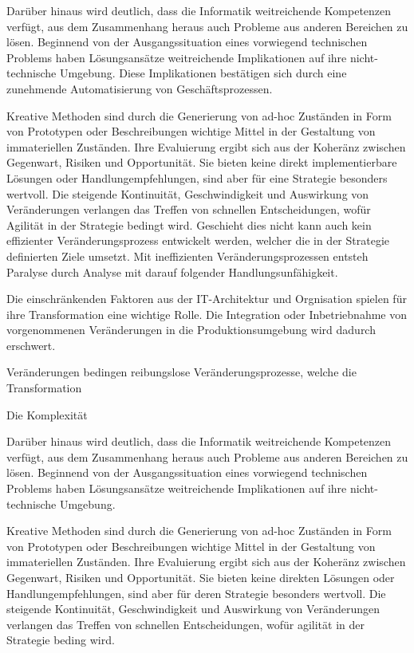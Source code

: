 Darüber hinaus wird deutlich, dass die Informatik weitreichende Kompetenzen verfügt, aus dem Zusammenhang heraus auch Probleme aus anderen Bereichen zu lösen. Beginnend von der Ausgangssituation eines vorwiegend technischen Problems haben Lösungsansätze weitreichende Implikationen auf ihre nicht-technische Umgebung. Diese Implikationen bestätigen sich durch eine zunehmende Automatisierung von Geschäftsprozessen.

Kreative Methoden sind durch die Generierung von ad-hoc Zuständen in Form von Prototypen oder Beschreibungen wichtige Mittel in der Gestaltung von immateriellen Zuständen. Ihre Evaluierung ergibt sich aus der Koheränz zwischen Gegenwart, Risiken und Opportunität. Sie bieten keine direkt implementierbare Lösungen oder Handlungempfehlungen, sind aber für eine Strategie besonders wertvoll. Die steigende Kontinuität, Geschwindigkeit und Auswirkung von Veränderungen verlangen das Treffen von schnellen Entscheidungen, wofür Agilität in der Strategie bedingt wird. Geschieht dies nicht kann auch kein effizienter Veränderungsprozess entwickelt werden, welcher die in der Strategie definierten Ziele umsetzt. Mit ineffizienten Veränderungsprozessen entsteh Paralyse durch Analyse mit darauf folgender Handlungsunfähigkeit. 

Die einschränkenden Faktoren aus der IT-Architektur und Orgnisation spielen für ihre Transformation eine wichtige Rolle. Die Integration oder Inbetriebnahme von vorgenommenen Veränderungen in die Produktionsumgebung wird dadurch erschwert. 

Veränderungen bedingen reibungslose Veränderungsprozesse, welche die Transformation 


Die Komplexität

Darüber hinaus wird deutlich, dass die Informatik weitreichende Kompetenzen verfügt, aus dem Zusammenhang heraus auch Probleme aus anderen Bereichen zu lösen. Beginnend von der Ausgangssituation eines vorwiegend technischen Problems haben Lösungsansätze weitreichende Implikationen auf ihre nicht-technische Umgebung.

Kreative Methoden sind durch die Generierung von ad-hoc Zuständen in Form von Prototypen oder Beschreibungen wichtige Mittel in der Gestaltung von immateriellen Zuständen. Ihre Evaluierung ergibt sich aus der Koheränz zwischen Gegenwart, Risiken und Opportunität. Sie bieten keine direkten Lösungen oder Handlungempfehlungen, sind aber für deren Strategie besonders wertvoll. Die steigende Kontinuität, Geschwindigkeit und Auswirkung von Veränderungen verlangen das Treffen von schnellen Entscheidungen, wofür agilität in der Strategie beding wird.
